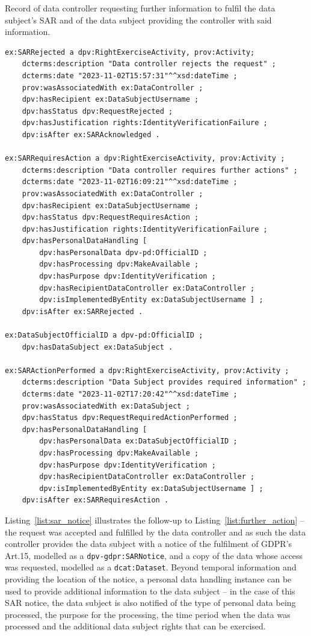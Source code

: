 \begin{listing}[htp]
\caption{Record of data controller requesting further information to fulfil the data subject's SAR and of the data subject providing the controller with said information.}
\label{list:further_action}
\begin{verbatim}
ex:SARRejected a dpv:RightExerciseActivity, prov:Activity;
    dcterms:description "Data controller rejects the request" ;
    dcterms:date "2023-11-02T15:57:31"^^xsd:dateTime ;
    prov:wasAssociatedWith ex:DataController ;
    dpv:hasRecipient ex:DataSubjectUsername ;
    dpv:hasStatus dpv:RequestRejected ;
    dpv:hasJustification rights:IdentityVerificationFailure ;
    dpv:isAfter ex:SARAcknowledged .

ex:SARRequiresAction a dpv:RightExerciseActivity, prov:Activity ;
    dcterms:description "Data controller requires further actions" ;
    dcterms:date "2023-11-02T16:09:21"^^xsd:dateTime ;
    prov:wasAssociatedWith ex:DataController ;
    dpv:hasRecipient ex:DataSubjectUsername ;
    dpv:hasStatus dpv:RequestRequiresAction ;
    dpv:hasJustification rights:IdentityVerificationFailure ;
    dpv:hasPersonalDataHandling [
        dpv:hasPersonalData dpv-pd:OfficialID ;
        dpv:hasProcessing dpv:MakeAvailable ;
        dpv:hasPurpose dpv:IdentityVerification ;
        dpv:hasRecipientDataController ex:DataController ;
        dpv:isImplementedByEntity ex:DataSubjectUsername ] ;
    dpv:isAfter ex:SARRejected .

ex:DataSubjectOfficialID a dpv-pd:OfficialID ;
    dpv:hasDataSubject ex:DataSubject .

ex:SARActionPerformed a dpv:RightExerciseActivity, prov:Activity ;
    dcterms:description "Data Subject provides required information" ;
    dcterms:date "2023-11-02T17:20:42"^^xsd:dateTime ;
    prov:wasAssociatedWith ex:DataSubject ;
    dpv:hasStatus dpv:RequestRequiredActionPerformed ;
    dpv:hasPersonalDataHandling [
        dpv:hasPersonalData ex:DataSubjectOfficialID ;
        dpv:hasProcessing dpv:MakeAvailable ;
        dpv:hasPurpose dpv:IdentityVerification ;
        dpv:hasRecipientDataController ex:DataController ;
        dpv:isImplementedByEntity ex:DataSubjectUsername ] ;
    dpv:isAfter ex:SARRequiresAction .
\end{verbatim}
\end{listing}

Listing~\ref{list:sar_notice} illustrates the follow-up to Listing~\ref{list:further_action} -- the request was accepted and fulfilled by the data controller and as such the data controller provides the data subject with a notice of the fulfilment of GDPR's Art.15, modelled as a \texttt{dpv-gdpr:SARNotice}, and a copy of the data whose access was requested, modelled as a \texttt{dcat:Dataset}.
Beyond temporal information and providing the location of the notice, a personal data handling instance can be used to provide additional information to the data subject -- in the case of this SAR notice, the data subject is also notified of the type of personal data being processed, the purpose for the processing, the time period when the data was processed and the additional data subject rights that can be exercised.

